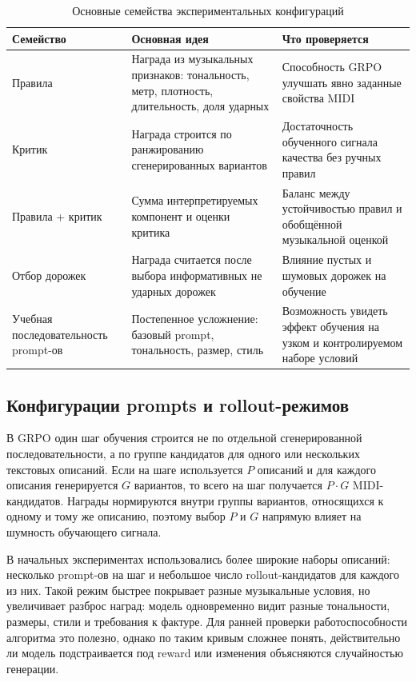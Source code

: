 \documentclass[a4paper,12pt]{extarticle}
\begin{document}
\begin{table}[h]
\centering
\caption{Основные семейства экспериментальных конфигураций}
\label{tab:experiment-families}
\begin{tabular}{|p{}|p{}|p{}|}
\hline
\textbf{Семейство} & \textbf{Основная идея} & \textbf{Что проверяется} \\
\hline
Правила & Награда из музыкальных признаков: тональность, метр, плотность,
длительность, доля ударных & Способность GRPO улучшать явно заданные
свойства MIDI \\
\hline
Критик & Награда строится по ранжированию сгенерированных вариантов &
Достаточность обученного сигнала качества без ручных правил \\
\hline
Правила + критик & Сумма интерпретируемых компонент и оценки критика &
Баланс между устойчивостью правил и обобщённой музыкальной оценкой \\
\hline
Отбор дорожек & Награда считается после выбора информативных не ударных
дорожек & Влияние пустых и шумовых дорожек на обучение \\
\hline
Учебная последовательность prompt-ов & Постепенное усложнение: базовый
prompt, тональность, размер, стиль & Возможность увидеть эффект обучения
на узком и контролируемом наборе условий \\
\hline
\end{tabular}
\end{table}

\subsection{Конфигурации prompts и rollout-режимов}

В GRPO один шаг обучения строится не по отдельной сгенерированной
последовательности, а по группе кандидатов для одного или нескольких
текстовых описаний. Если на шаге используется $P$ описаний и для каждого
описания генерируется $G$ вариантов, то всего на шаг получается
$P \cdot G$ MIDI-кандидатов. Награды нормируются внутри группы вариантов,
относящихся к одному и тому же описанию, поэтому выбор $P$ и $G$ напрямую
влияет на шумность обучающего сигнала.

В начальных экспериментах использовались более широкие наборы описаний:
несколько prompt-ов на шаг и небольшое число rollout-кандидатов для каждого
из них. Такой режим быстрее покрывает разные музыкальные условия, но
увеличивает разброс наград: модель одновременно видит разные тональности,
размеры, стили и требования к фактуре. Для ранней проверки работоспособности
алгоритма это полезно, однако по таким кривым сложнее понять, действительно
ли модель подстраивается под reward или изменения объясняются случайностью
генерации.
\end{document}
